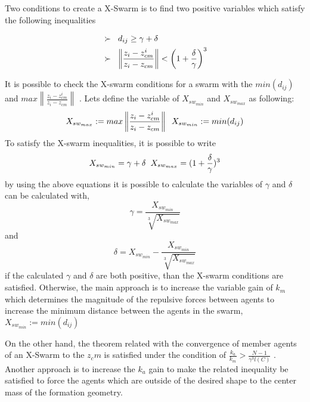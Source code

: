 \documentclass[twoside]{article}
\newcommand{\norm}[1]{\left\lVert#1\right\rVert}
\begin{document}
\begin{multicols}{2}
Two conditions to create a X-Swarm is to find two positive variables which satisfy the following inequalities

		\begin{align*}
		&\succ\hspace{0.2cm}  d_{ij} \geq \gamma + \delta \\
		&\succ \hspace{0.2cm}   \norm{\frac{z_i - z_{cm}^i}{z_i - z_{cm}}} < \left(1+\frac{\delta}{\gamma}\right)^3
		\end{align*}
		
		It is possible to check the X-swarm conditions for a swarm  with the $min(d_{ij})$ and $max \norm{\frac{z_i - z_{cm}^i}{z_i - z_{cm}}} $ . Lets define the variable  of $X_{sw_{min}}$ and $X_{sw_{max}}$ as following:
		\begin{equation}
X_{sw_{max}} := max \norm{\frac{z_i - z_{cm}^i}{z_i - z_{cm}}}  \hspace{0.2cm} X_{sw_{min}} := min(d_{ij})
		\end{equation}
			To satisfy the X-swarm inequalities, it is possible to write 
			\begin{equation}
 X_{sw_{min}} = \gamma + \delta  \hspace{0.2cm} X_{sw_{max}} = (1 + \frac{\delta}{\gamma})^3
			\end{equation}
			by using the above equations it is possible to calculate the variables of $\gamma$ and $\delta$ can be calculated with,
			\begin{equation}
  \gamma = \frac{ X_{sw_{min}}}{\sqrt[3]{ X_{sw_{max}}}}
			\end{equation}
			and
			\begin{equation}
\delta =  X_{sw_{min}} - \frac{ X_{sw_{min}}}{\sqrt[3]{ X_{sw_{max}}}}
			\end{equation}
			if the calculated  $\gamma$ and $\delta$ are both positive, than the X-swarm conditions are satisfied. Otherwise, the main approach is to increase the variable gain of $k_m$ which determines the magnitude of the repulsive forces between agents to increase the minimum distance between the agents in the swarm, $X_{sw_{min}} := min(d_{ij})$
			
			On the other hand, the theorem related with the convergence of member agents of an X-Swarm to the $z_cm$ is satisfied under the condition of $\frac{k_a}{k_m} > \frac{N-1}{\gamma^3  l(C)}$ . Another approach is to increase the $k_a$ gain to make the related inequality be satisfied to force the agents which are outside of the desired shape to the center mass of the formation geometry. 
			

\end{multicols}
\end{document}
